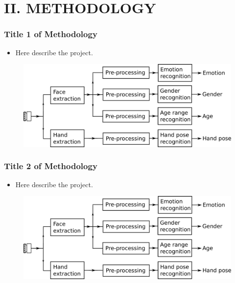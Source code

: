 \documentclass{beamer}
\begin{document}
\section{II. METHODOLOGY}
 

 
\begin{frame}\frametitle{Title 1 of Methodology}

\begin{itemize}
\item Here describe the project.
\end{itemize}

\begin{figure}
\includegraphics[scale=0.4]{images/diagram.png}
\end{figure}

\end{frame}



\begin{frame}\frametitle{Title 2 of Methodology}

\begin{itemize}
\item Here describe the project.
\end{itemize}

\begin{figure}
\includegraphics[scale=0.4]{images/diagram.png}
\end{figure}

\end{frame}
\end{document}
